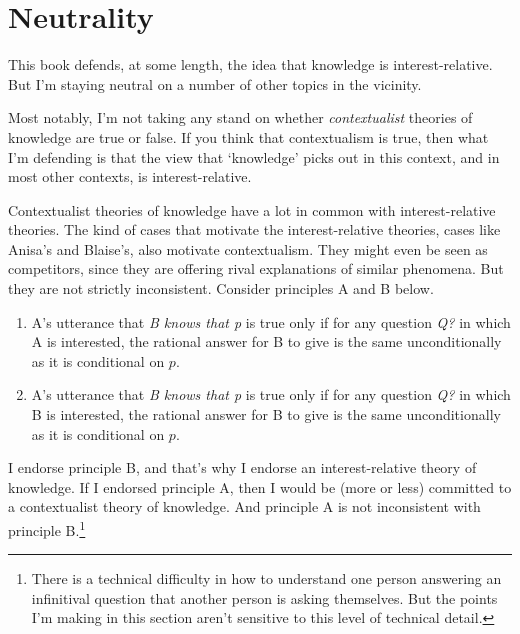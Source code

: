 \documentclass[11pt,]{book}
\providecommand{\tightlist}{%
  \setlength{\itemsep}{0pt}\setlength{\parskip}{0pt}}
\let\rmarkdownfootnote\footnote%
\def\footnote{\protect\rmarkdownfootnote}
\begin{document}
\hypertarget{neutrality}{%
\section{Neutrality}\label{neutrality}}

This book defends, at some length, the idea that knowledge is interest-relative. But I'm staying neutral on a number of other topics in the vicinity.

Most notably, I'm not taking any stand on whether \emph{contextualist} theories of knowledge are true or false. If you think that contextualism is true, then what I'm defending is that the view that `knowledge' picks out in this context, and in most other contexts, is interest-relative.

Contextualist theories of knowledge have a lot in common with interest-relative theories. The kind of cases that motivate the interest-relative theories, cases like Anisa's and Blaise's, also motivate contextualism. They might even be seen as competitors, since they are offering rival explanations of similar phenomena. But they are not strictly inconsistent. Consider principles A and B below.

\begin{enumerate}
\def\labelenumi{\Alph{enumi}.}
\tightlist
\item
  A's utterance that \emph{B knows that p} is true only if for any question \emph{Q?} in which A is interested, the rational answer for B to give is the same unconditionally as it is conditional on \(p\).
\item
  A's utterance that \emph{B knows that p} is true only if for any question \emph{Q?} in which B is interested, the rational answer for B to give is the same unconditionally as it is conditional on \(p\).
\end{enumerate}

I endorse principle B, and that's why I endorse an interest-relative theory of knowledge. If I endorsed principle A, then I would be (more or less) committed to a contextualist theory of knowledge. And principle A is not inconsistent with principle B.\footnote{There is a technical difficulty in how to understand one person answering an infinitival question that another person is asking themselves. But the points I'm making in this section aren't sensitive to this level of technical detail.}
\end{document}
